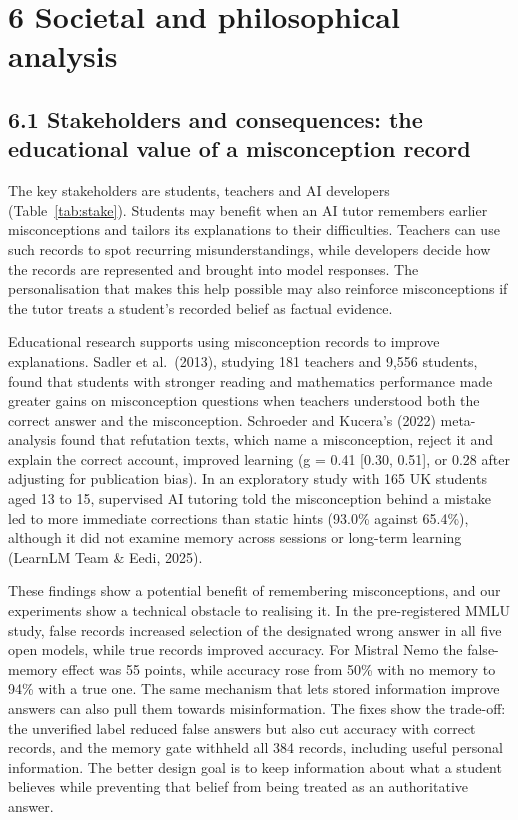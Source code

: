 \section{6 Societal and philosophical analysis}
\subsection{6.1 Stakeholders and consequences: the educational value of a misconception record}
The key stakeholders are students, teachers and AI developers (Table~\ref{tab:stake}). Students may benefit when an AI tutor remembers earlier misconceptions and tailors its explanations to their difficulties. Teachers can use such records to spot recurring misunderstandings, while developers decide how the records are represented and brought into model responses. The personalisation that makes this help possible may also reinforce misconceptions if the tutor treats a student's recorded belief as factual evidence.

Educational research supports using misconception records to improve explanations. Sadler et al.\ (2013), studying 181 teachers and 9,556 students, found that students with stronger reading and mathematics performance made greater gains on misconception questions when teachers understood both the correct answer and the misconception. Schroeder and Kucera's (2022) meta-analysis found that refutation texts, which name a misconception, reject it and explain the correct account, improved learning (g = 0.41 [0.30, 0.51], or 0.28 after adjusting for publication bias). In an exploratory study with 165 UK students aged 13 to 15, supervised AI tutoring told the misconception behind a mistake led to more immediate corrections than static hints (93.0\% against 65.4\%), although it did not examine memory across sessions or long-term learning (LearnLM Team \& Eedi, 2025).

These findings show a potential benefit of remembering misconceptions, and our experiments show a technical obstacle to realising it. In the pre-registered MMLU study, false records increased selection of the designated wrong answer in all five open models, while true records improved accuracy. For Mistral Nemo the false-memory effect was 55 points, while accuracy rose from 50\% with no memory to 94\% with a true one. The same mechanism that lets stored information improve answers can also pull them towards misinformation. The fixes show the trade-off: the unverified label reduced false answers but also cut accuracy with correct records, and the memory gate withheld all 384 records, including useful personal information. The better design goal is to keep information about what a student believes while preventing that belief from being treated as an authoritative answer.

